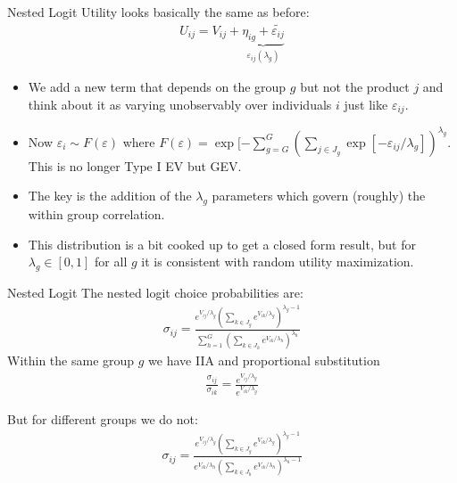\documentclass[aspectratio=169,11pt]{beamer}
\begin{document}
\begin{frame}{Nested Logit}
Utility looks basically the same as before:
\begin{eqnarray*}
U_{ij} = V_{ij} + \underbrace{\eta_{ig} + \widetilde{\varepsilon_{ij}}}_{\varepsilon_{ij}(\lambda_g)}
\end{eqnarray*}
\begin{itemize}
\item We add a new term that depends on the group $g$ but not the product $j$ and think about it as varying unobservably over individuals $i$ just like $\varepsilon_{ij}$.
\item Now $\varepsilon_i \sim F(\varepsilon)$ where $F(\varepsilon) = \exp[-\sum_{g=G}^G \left(\sum_{j \in J_g} \exp[-\varepsilon_{ij}/\lambda_g]\right)^{\lambda_g}$. This is no longer Type I EV but GEV.
\item The key is the addition of the $\lambda_g$ parameters which govern (roughly) the within group correlation.
\item This distribution is a bit cooked up to get a closed form result, but for $\lambda_g \in [0,1]$ for all $g$ it is consistent with random utility maximization.
\end{itemize}
\end{frame}

\begin{frame}{Nested Logit}
The nested logit choice probabilities are:
\begin{eqnarray*}
\sigma_{ij} = \frac{ e^{V_{ij}/\lambda_g} \left(\sum_{k \in J_g} e^{V_{ik}/\lambda_g} \right)^{\lambda_g -1}}{\sum_{h=1}^G \left(\sum_{k \in J_h} e^{V_{ik}/\lambda_h} \right)^{\lambda_h}}
\end{eqnarray*}
Within the same group $g$ we have IIA and proportional substitution 
\begin{eqnarray*}
\frac{\sigma_{ij}}{\sigma_{ik}} = \frac{ e^{V_{ij}/\lambda_g}}{ e^{V_{ik}/\lambda_g}}
\end{eqnarray*}

But for different groups we do not:
\begin{eqnarray*}
\sigma_{ij} = \frac{ e^{V_{ij}/\lambda_g} \left(\sum_{k \in J_g} e^{V_{ik}/\lambda_g} \right)^{\lambda_g -1}}{ e^{V_{ik}/\lambda_h} \left(\sum_{k \in J_h} e^{V_{ik}/\lambda_h} \right)^{\lambda_h -1}}
\end{eqnarray*}
\end{frame}
\end{document}
